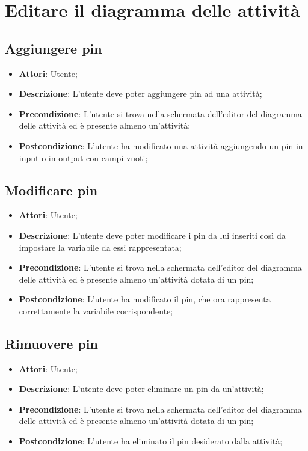 \documentclass[../AnalisiDeiRequisiti.tex]{subfiles}
\begin{document}
	\section{Editare il diagramma delle attività}
	\subsection{Aggiungere pin}
	\begin{itemize}
		\item \textbf{Attori}: Utente;
		\item \textbf{Descrizione}: L’utente deve poter aggiungere pin ad una attività;
		\item \textbf{Precondizione}: L’utente si trova nella schermata dell’editor del diagramma delle attività ed è presente almeno un’attività;
		\item \textbf{Postcondizione}: L’utente ha modificato una attività aggiungendo un pin in input o in output con campi vuoti;
	\end{itemize}
	
	\subsection{Modificare pin}
	\begin{itemize}
		\item \textbf{Attori}: Utente;
		\item \textbf{Descrizione}: L’utente deve poter modificare i pin da lui inseriti così da impostare la variabile da essi rappresentata;
		\item \textbf{Precondizione}: L’utente si trova nella schermata dell’editor del diagramma delle attività ed è presente almeno un’attività dotata di un pin;
		\item \textbf{Postcondizione}: L’utente ha modificato il pin, che ora rappresenta correttamente la variabile corrispondente;
	\end{itemize}
	
	\subsection{Rimuovere pin}
	\begin{itemize}
		\item \textbf{Attori}: Utente;
		\item \textbf{Descrizione}: L’utente deve poter eliminare un pin da un’attività;
		\item \textbf{Precondizione}: L’utente si trova nella schermata dell’editor del diagramma delle attività ed è presente almeno un’attività dotata di un pin;
		\item \textbf{Postcondizione}: L’utente ha eliminato il pin desiderato dalla attività;
	\end{itemize}
	
\end{document}
